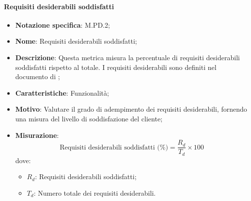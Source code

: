 \paragraph*{Requisiti desiderabili soddisfatti}
\begin{itemize}
    \item \textbf{Notazione specifica}: M.PD.2;
    \item \textbf{Nome}: Requisiti desiderabili soddisfatti;
    \item \textbf{Descrizione}: Questa metrica misura la percentuale di requisiti desiderabili soddisfatti rispetto al totale. I requisiti desiderabili sono definiti nel documento di \AnalisiDeiRequisiti;
    \item \textbf{Caratteristiche}: Funzionalità;
    \item \textbf{Motivo}: Valutare il grado di adempimento dei requisiti desiderabili, fornendo una misura del livello di soddisfazione del cliente;
    \item \textbf{Misurazione}:
    \[
    \text{Requisiti desiderabili soddisfatti (\%)} = \frac{R_{d}}{T_{d}} \times 100
    \]
    dove:
    \begin{itemize}
        \item $R_{d}$: Requisiti desiderabili soddisfatti;
        \item $T_{d}$: Numero totale dei requisiti desiderabili.
    \end{itemize}
\end{itemize}